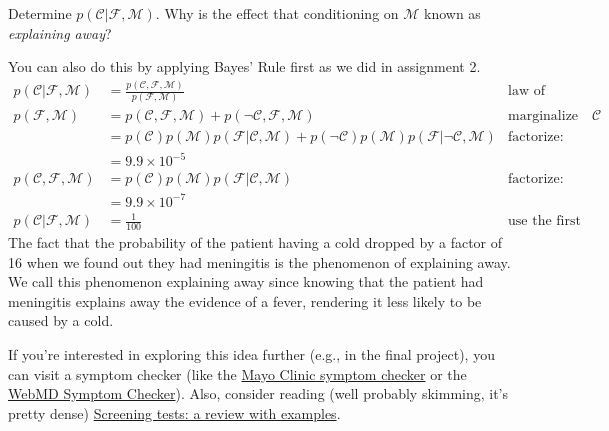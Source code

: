\documentclass[review_Solutions]{subfiles}
\begin{document}
\begin{exercise}
\item Determine $p(\mathcal{C}|\mathcal{F}, \mathcal{M})$.  Why is the effect that conditioning on $\mathcal{M}$ known as \emph{explaining away}?
\begin{boxedsolution}
You can also do this by applying Bayes' Rule first as we did in assignment 2.
\begin{align}
p(\mathcal{C}|\mathcal{F}, \mathcal{M}) &= \frac{p(\mathcal{C}, \mathcal{F}, \mathcal{M})}{p(\mathcal{F}, \mathcal{M})}& \mbox{law of conditional probability} \nonumber \\
p(\mathcal{F}, \mathcal{M}) &= p(\mathcal{C}, \mathcal{F}, \mathcal{M}) + p(\neg \mathcal{C}, \mathcal{F}, \mathcal{M})&\mbox{marginalize over $\mathcal{C}$} \nonumber \\
&= p(\mathcal{C}) p(\mathcal{M}) p(\mathcal{F}|\mathcal{C}, \mathcal{M}) + p(\neg \mathcal{C}) p(\mathcal{M}) p(\mathcal{F}|\neg\mathcal{C}, \mathcal{M}) & \mbox{factorize: children given parents}\nonumber \\
&= 9.9 \times 10^{-5} \nonumber \\
 p(\mathcal{C}, \mathcal{F}, \mathcal{M}) &= p(\mathcal{C}) p(\mathcal{M}) p(\mathcal{F}|\mathcal{C}, \mathcal{M})  & \mbox{factorize: children given parents}\nonumber \\
 &= 9.9 \times 10^{-7} \nonumber \\
 p(\mathcal{C}|\mathcal{F}, \mathcal{M}) &= \frac{1}{100} &\mbox{use the first equation in this box} \nonumber
\end{align}
The fact that the probability of the patient having a cold dropped by a factor of 16 when we found out they had meningitis is the phenomenon of explaining away.  We call this phenomenon explaining away since knowing that the patient had meningitis explains away the evidence of a fever, rendering it less likely to be caused by a cold.

\end{boxedsolution}
\ees

\noindent If you're interested in exploring this idea further (e.g., in the final project), you can visit a symptom checker (like the \href{https://www.mayoclinic.org/symptom-checker/select-symptom/itt-20009075}{Mayo Clinic symptom checker} or the \href{https://symptoms.webmd.com/default.htm\#/info}{WebMD Symptom Checker}).  Also, consider reading (well probably skimming, it's pretty dense) \href{https://www.ncbi.nlm.nih.gov/pmc/articles/PMC4389712/}{Screening tests: a review with examples}.

\end{exercise}
\end{document}
